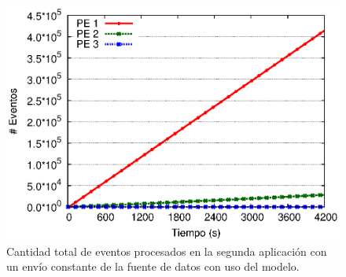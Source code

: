\begin{figure}[!ht]
\centering
    \includegraphics[scale=0.7]{images/exp/app2/uniform/sm/eventCount.eps}
    \caption{Cantidad total de eventos procesados en la segunda aplicación con un envío constante de la fuente de datos con uso del modelo.}
    \label{fig:app2-uniform-eventCount-sm}
\end{figure}


